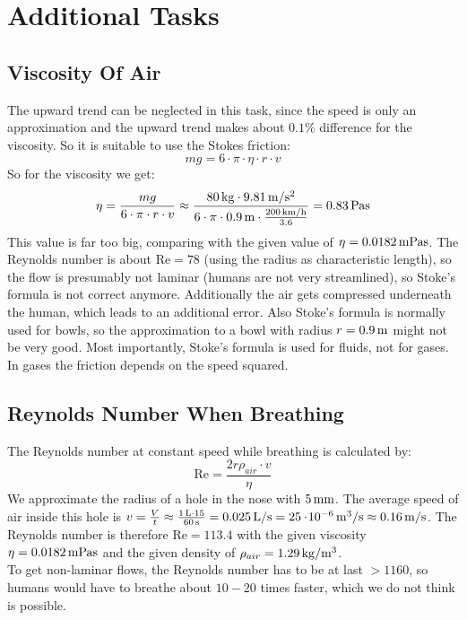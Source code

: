 \section{Additional Tasks}
\subsection{Viscosity Of Air}
The upward trend can be neglected in this task, since the speed is only an approximation and the upward trend makes about $0.1\%$ difference for the viscosity. So it is suitable to use the Stokes friction:
\begin{equation*}
mg = 6 \cdot \pi \cdot \eta \cdot r \cdot v
\end{equation*}
So for the viscosity we get:
\begin{equation}
\eta = \frac{mg}{6 \cdot \pi \cdot r \cdot v} \approx \frac{\unit[80]{kg}\cdot \unit[9.81]{m/s^2}}{6 \cdot \pi \cdot \unit[0.9]{m} \cdot \frac{\unit[200]{km/h}}{3.6}} = \unit[0.83]{Pa s}
\end{equation}
This value is far too big, comparing with the given value of $\eta = \unit[0.0182]{mPa s}$. The Reynolds number is about $\text{Re} = 78$ (using the radius as characteristic length), so the flow is presumably not laminar (humans are not very streamlined), so Stoke's formula is not correct anymore. Additionally the air gets compressed underneath the human, which leads to an additional error. Also Stoke's formula is normally used for bowls, so the approximation to a bowl with radius $r = \unit[0.9]{m}$ might not be very good. Most importantly, Stoke's formula is used for fluids, not for gases. In gases the friction depends on the speed squared.



\subsection{Reynolds Number When Breathing}
The Reynolds number at constant speed while breathing is calculated by:
\begin{equation}
\text{Re} = \frac{2r \rho_{air} \cdot v}{\eta}
\end{equation}
We approximate the radius of a hole in the nose with $\unit[5]{mm}$. The average speed of air inside this hole is $v = \frac{V}{t} \approx \frac{\unit[1]{L} \cdot 15}{\unit[60]{s}} = \unit[0.025]{L/s} = \unit[25\e{-6}]{m^3/s} \approx \unit[0.16]{m/s}$. The Reynolds number is therefore $\text{Re} = 113.4$ with the given viscosity $\eta = \unit[0.0182]{mPa s}$ and the given density of $\rho_{air} = \unit[1.29]{kg/m^3}$.\\
To get non-laminar flows, the Reynolds number has to be at last $>1160$, so humans would have to breathe about $10-20$ times faster, which we do not think is possible.